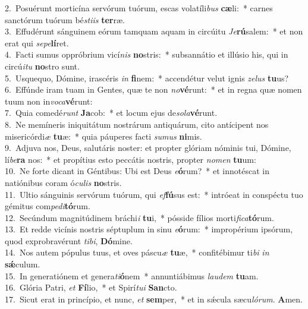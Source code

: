 {2.~}Posuérunt morticína servórum tuórum, escas volatíli\textit{bus} \textbf{cæ}li:~* carnes sanctórum tuórum bé\textit{sti}\textit{is} \textbf{ter}ræ.\\
{3.~}Effudérunt sánguinem eórum tamquam aquam in circúitu \textit{Je}\textbf{rú}salem:~* et non erat qui \textit{se}\textit{pe}\textbf{lí}ret.\\
{4.~}Facti sumus oppróbrium vicí\textit{nis} \textbf{no}stris:~* subsannátio et illúsio his, qui in circú\textit{i}\textit{tu} \textbf{no}stro sunt.\\
{5.~}Usquequo, Dómine, irascéris \textit{in} \textbf{fi}nem:~* accendétur velut ignis \textit{ze}\textit{lus} \textbf{tu}us?\\
{6.~}Effúnde iram tuam in Gentes, quæ te non \textit{no}\textbf{vé}runt:~* et in regna quæ nomen tuum non in\textit{vo}\textit{ca}\textbf{vé}runt:\\
{7.~}Quia comedé\textit{runt} \textbf{Ja}cob:~* et locum ejus de\textit{so}\textit{la}\textbf{vé}runt.\\
{8.~}Ne memíneris iniquitátum nostrárum antiquárum, cito antícipent nos misericórdi\textit{æ} \textbf{tu}æ:~* quia páuperes facti \textit{su}\textit{mus} \textbf{ni}mis.\\
{9.~}Adjuva nos, Deus, salutáris noster: et propter glóriam nóminis tui, Dómine, lí\textit{be}\textbf{ra} nos:~* et propítius esto peccátis nostris, propter \textit{no}\textit{men} \textbf{tu}um:\\
{10.~}Ne forte dicant in Géntibus: Ubi est Deus \textit{e}\textbf{ó}rum?~* et innotéscat in natiónibus coram ó\textit{cu}\textit{lis} \textbf{no}stris.\\
{11.~}Ultio sánguinis servórum tuórum, qui \textit{ef}\textbf{fú}sus est:~* intróeat in conspéctu tuo gémitus com\textit{pe}\textit{di}\textbf{tó}rum.\\
{12.~}Secúndum magnitúdinem bráchi\textit{i} \textbf{tu}i,~* pósside fílios morti\textit{fi}\textit{ca}\textbf{tó}rum.\\
{13.~}Et redde vicínis nostris séptuplum in sinu \textit{e}\textbf{ó}rum:~* impropérium ipsórum, quod exprobravérunt \textit{ti}\textit{bi}, \textbf{Dó}mine.\\
{14.~}Nos autem pópulus tuus, et oves páscu\textit{æ} \textbf{tu}æ,~* confitébimur ti\textit{bi} \textit{in} \textbf{sǽ}culum.\\
{15.~}In generatiónem et genera\textit{ti}\textbf{ó}nem~* annuntiábimus \textit{lau}\textit{dem} \textbf{tu}am.\\
{16.~}Glória Patri, \textit{et} \textbf{Fí}lio,~* et Spirí\textit{tu}\textit{i} \textbf{San}cto.\\
{17.~}Sicut erat in princípio, et nunc, \textit{et} \textbf{sem}per,~* et in sǽcula sæcu\textit{ló}\textit{rum}. \textbf{A}men.\\

